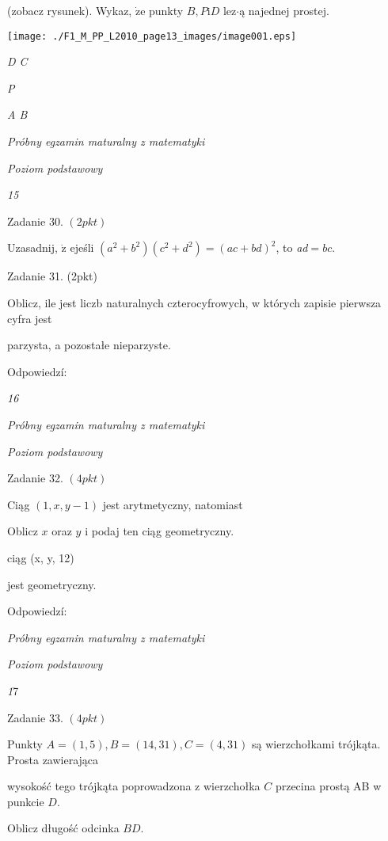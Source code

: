\documentclass[a4paper,12pt]{article}
\begin{document}
(zobacz rysunek). Wykaz, $\dot{\mathrm{z}}\mathrm{e}$ punkty $B, P\mathrm{i}D$ lez$\cdot$ą najednej prostej.
\begin{center}
\texttt{[image: ./F1\_M\_PP\_L2010\_page13\_images/image001.eps]}
\end{center}
{\it D  C}

{\it P}

{\it A  B}





{\it Próbny egzamin maturalny z matematyki}

{\it Poziom podstawowy}

{\it 15}

Zadanie 30. $(2pkt)$

Uzasadnij, $\dot{\mathrm{z}}$ ejeśli $(a^{2}+b^{2})(c^{2}+d^{2})=(ac+bd)^{2}$, to {\it ad}$=bc.$

Zadanie 31. (2pkt)

Oblicz, ile jest liczb naturalnych czterocyfrowych, w których zapisie pierwsza cyfra jest

parzysta, a pozostałe nieparzyste.

Odpowiedzí:





{\it 16}

{\it Próbny egzamin maturalny z matematyki}

{\it Poziom podstawowy}

Zadanie 32. $(4pkt)$

Ciąg $(1,x,y-1)$ jest arytmetyczny, natomiast

Oblicz $x$ oraz $y$ i podaj ten ciąg geometryczny.

ciąg (x, y, 12)

jest geometryczny.

Odpowiedzí:





{\it Próbny egzamin maturalny z matematyki}

{\it Poziom podstawowy}

{\it 1}7

Zadanie 33. $(4pkt)$

Punkty $A=(1,5), B=(14,31), C=(4,31)$ są wierzchołkami trójkąta. Prosta zawierająca

wysokość tego trójkąta poprowadzona z wierzchołka $C$ przecina prostą AB w punkcie $D.$

Oblicz długość odcinka $BD.$
\end{document}
